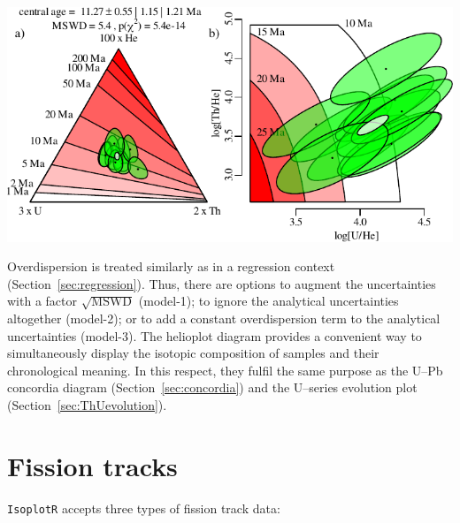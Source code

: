 \begin{refsection}
\noindent\begin{minipage}[t]{.7\linewidth}
\strut\vspace*{-\baselineskip}\newline
\includegraphics[width=\textwidth]{../figures/helioplot.pdf}\\
\end{minipage}
\begin{minipage}[t]{.3\linewidth}
  \label{fig:UThHeIsochronHelioplot}
\end{minipage}

Overdispersion is treated similarly as in a regression context
(Section~\ref{sec:regression}).  Thus, there are options to augment
the uncertainties with a factor $\sqrt{\mbox{MSWD}}$ (model-1); to
ignore the analytical uncertainties altogether (model-2); or to add a
constant overdispersion term to the analytical uncertainties
(model-3).  The helioplot diagram provides a convenient way to
simultaneously display the isotopic composition of samples and their
chronological meaning. In this respect, they fulfil the same purpose
as the U--Pb concordia diagram (Section~\ref{sec:concordia}) and the
U--series evolution plot (Section~\ref{sec:ThUevolution}).

\section{Fission tracks}\label{sec:fissiontracks}

\texttt{IsoplotR} accepts three types of fission track data:


\end{refsection}

